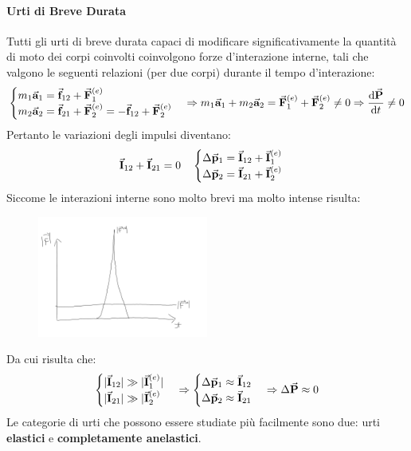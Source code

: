 \documentclass{report}
\newcommand{\then}{\ensuremath{\Rightarrow}}
\renewcommand{\a}{\va{a}}
\newcommand{\F}{\va{F}}
\newcommand{\f}{\va{f}}
\newcommand{\p}{\va{p}}
\renewcommand{\P}{\va{P}}
\newcommand{\I}{\va{I}}
\begin{document}
\paragraph{Urti di Breve Durata}
Tutti gli urti di breve durata capaci di modificare significativamente la quantità di moto dei corpi coinvolti coinvolgono forze d'interazione interne, tali che valgono le seguenti relazioni (per due corpi) durante il tempo d'interazione:
\begin{equation}
\begin{cases}
    m_1\a_1=\f_{12}+\F_1^{(e)}\\
    m_2\a_2=\f_{21}+\F_2^{(e)}=-\f_{12}+\F_2^{(e)}
\end{cases}\then m_1\a_1+m_2\a_2=\F_1^{(e)}+\F_2^{(e)}\neq0\then\dv{\P}{t}\neq0
\end{equation}
Pertanto le variazioni degli impulsi diventano:
\begin{equation}
\I_{12}+\I_{21}=0\quad
\begin{cases}
    \Delta\p_1=\I_{12}+\I_1^{(e)}\\
    \Delta\p_2=\I_{21}+\I_2^{(e)}
\end{cases}
\end{equation}
Siccome le interazioni interne sono molto brevi ma molto intense risulta:
\begin{figure}[H]
    \centering
    \includegraphics[width=0.5\textwidth]{UrtiBrevi.png}
\end{figure}
Da cui risulta che:
\begin{equation}
\begin{cases}
    |\I_{12}|\gg|\I_1^{(e)}|\\
    |\I_{21}|\gg|\I_2^{(e)}
\end{cases}\then
\begin{cases}
    \Delta\p_1\approx\I_{12}\\
    \Delta\p_2\approx\I_{21}
\end{cases}\then \Delta\P\approx0
\end{equation}
Le categorie di urti che possono essere studiate più facilmente sono due: urti \textbf{elastici} e \textbf{completamente anelastici}.
\end{document}

